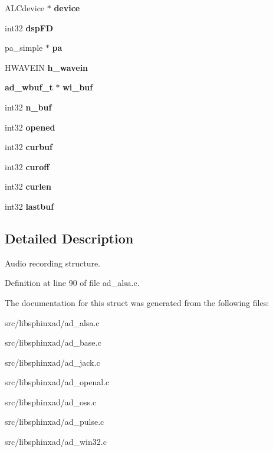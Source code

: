 \begin{DoxyCompactItemize}
\item 
A\-L\-Cdevice $\ast$ {\bfseries device}\label{structad__rec__s_a3e4378783effb06051461aca5a3d2f6c}

\item 
int32 {\bfseries dsp\-F\-D}\label{structad__rec__s_a7bd3eea2ed7b7be7155d4304505b140e}

\item 
pa\-\_\-simple $\ast$ {\bfseries pa}\label{structad__rec__s_a8ebda5d453f68928e21548739f27ceb9}

\item 
H\-W\-A\-V\-E\-I\-N {\bfseries h\-\_\-wavein}\label{structad__rec__s_a79081fc333f54eff7afdc23404f3ae69}

\item 
{\bf ad\-\_\-wbuf\-\_\-t} $\ast$ {\bfseries wi\-\_\-buf}\label{structad__rec__s_a81d0d2d45fe558b7e7c5504680b15dc5}

\item 
int32 {\bfseries n\-\_\-buf}\label{structad__rec__s_acd8fe38386d84c3e954f2652577c0c7e}

\item 
int32 {\bfseries opened}\label{structad__rec__s_a8f1c8d2056486373a7d87c89e995b8f2}

\item 
int32 {\bfseries curbuf}\label{structad__rec__s_a1eb7456dc028152343c8d538195a8aa3}

\item 
int32 {\bfseries curoff}\label{structad__rec__s_a1c7d3d94fc97bb318cbfe4aa33088b62}

\item 
int32 {\bfseries curlen}\label{structad__rec__s_ab9d6eff8b29d0741ed3b4133a57174ca}

\item 
int32 {\bfseries lastbuf}\label{structad__rec__s_a30b13811b7b97765861b776e29d5d34c}

\end{DoxyCompactItemize}


\subsection{Detailed Description}
Audio recording structure. 

Definition at line 90 of file ad\-\_\-alsa.\-c.



The documentation for this struct was generated from the following files\-:\begin{DoxyCompactItemize}
\item 
src/libsphinxad/ad\-\_\-alsa.\-c\item 
src/libsphinxad/ad\-\_\-base.\-c\item 
src/libsphinxad/ad\-\_\-jack.\-c\item 
src/libsphinxad/ad\-\_\-openal.\-c\item 
src/libsphinxad/ad\-\_\-oss.\-c\item 
src/libsphinxad/ad\-\_\-pulse.\-c\item 
src/libsphinxad/ad\-\_\-win32.\-c\end{DoxyCompactItemize}
